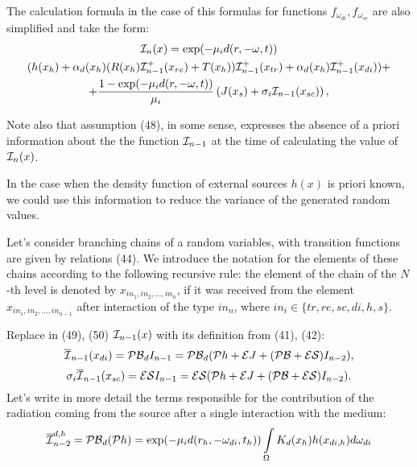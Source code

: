 \documentclass[12pt,reqno]{report}
\begin{document}
The calculation formula in the case of this formulas for functions $f_{\omega_{di}}, f_{\omega_{sc}}$
are also simplified and take the form:
 \begin{multline}
{\cal I}_n(x) = \exp(-\mu_i d(r, -\omega, t)) 
\\ (h(x_h) +  \alpha_d(x_h)(R(x_h) {\cal I}_{n-1}^+
(x_{re}) + T(x_h) ) {\cal I}_{n-1}^+ (x_{tr}) + \alpha_d(x_h) {\cal I}_{n-1}^+ (x_{di})) +
\\ + \frac{1 - \exp(-\mu_i d(r, -\omega, t))}{\mu_i} \left(J(x_s) + \sigma_i {\cal I}_{n-1}(x_{sc})\right),
\end{multline}
{Note also that assumption (48), in some sense,
expresses the absence of a priori information about the the function ${\cal I}_{n-1} $
at the time of calculating the value of $ {\cal I}_n(x) $.

In the case when the density function of external sources $h(x)$ is priori known,
we could use this information to reduce the variance of the generated random values.

Let's consider branching chains of a random variables, with transition functions are given by relations (44).
We introduce the notation for the elements of these chains according to the following recursive rule:
the element of the chain of the $N$-th level is denoted by $x_{in_1, in_2, ..., in_n}$,
if it was received from the element $x_{in_1, in_2, ..., in_{n-1}}$ after interaction of the type $in_n$,
where $in_i \in \{tr, re, sc, di, h, s\}$.

Replace in (49), (50) ${\cal I}_{n-1}(x)$ with its definition from (41), (42):
\begin{equation}
{\overline{\cal I}_{n-1}(x_{di})} = 
{\cal PB}_{d} I_{n-1} = {\cal PB}_{d} (\mathcal{P} h + \mathcal E J + (\mathcal{PB} + \mathcal{ES}) I_{n-2}),
\end{equation}
\begin{equation}
{\sigma_i \overline{\cal I}_{n-1}(x_{sc})} = {\cal ES}I_{n-1} = 
{\cal ES} (\mathcal{P} h + \mathcal E J + (\mathcal{PB} + \mathcal{ES}) I_{n-2}).
\end{equation}
Let's write in more detail the terms responsible for the contribution of the radiation coming from the source after a single interaction with the medium:
\begin{equation}
{\overline{\cal I}_{n-2}^{d, h}} = {\cal PB}_{d} (\mathcal{P} h) =
\exp(- \mu_i d(r_h, -\omega_{di}, t_h))  \int\limits_{\Omega} K_d(x_h) h(x_{di, h})d\omega_{di}
\end{equation}

}
\end{document}
